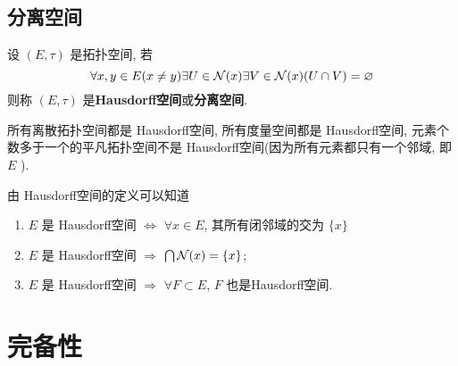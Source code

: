      \subsection{分离空间}

     \begin{Definition}[Hausdorff空间]\label{def:Hausdorff空间}
          设 $ (E, \tau) $ 是拓扑空间, 若 
          \[
               \forall x, y\in E(x\neq y)\exists U\in \mathcal{N}(x)\exists V\in\mathcal{N}(x) (U\cap V)=\varnothing
          \]
          则称 $ (E, \tau) $ 是\textbf{Hausdorff空间}或\textbf{分离空间}. 
     \end{Definition}
     \begin{Example}
          所有离散拓扑空间都是 Hausdorff空间, 所有度量空间都是 Hausdorff空间, 元素个数多于一个的平凡拓扑空间不是 Hausdorff空间(因为所有元素都只有一个邻域, 即 $ E $ ). 
     \end{Example}
     \begin{Proposition}\label{prop:Hausdorff空间的相关命题1}
          由 Hausdorff空间的定义可以知道
          \begin{enumerate}[(1)]
               \item  $ E $ 是 Hausdorff空间 $ \Longleftrightarrow $ $ \forall x\in E $, 其所有闭邻域的交为 $\{ x \}$
               \item $ E $ 是 Hausdorff空间 $ \Longrightarrow $ $\bigcap \mathcal{N}(x)=\{x\}$;
               \item $ E $ 是 Hausdorff空间 $ \Longrightarrow $ $ \forall F\subset E $, $ F $ 也是Hausdorff空间. 
          \end{enumerate}
     \end{Proposition}
     
\section{完备性}
